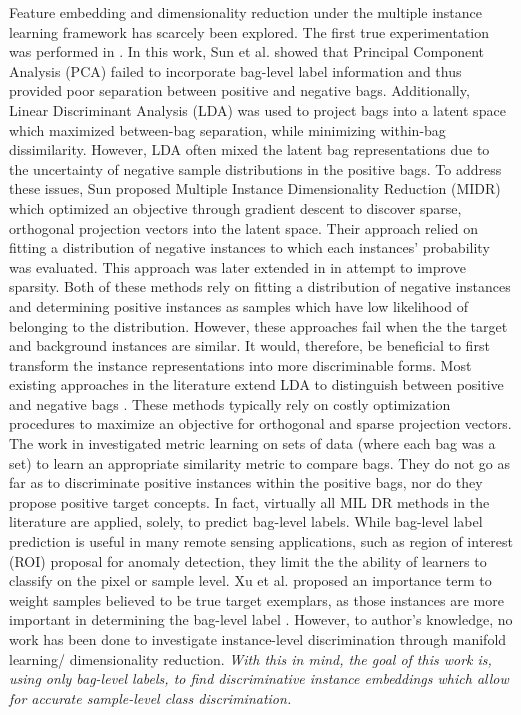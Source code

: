 Feature embedding and dimensionality reduction under the multiple instance learning framework has scarcely been explored.  The first true experimentation was performed in \cite{Sun2010MIDR}.  In this work, Sun et al. showed that Principal Component Analysis (PCA) failed to incorporate bag-level label information and thus provided poor separation between positive and negative bags.  Additionally, Linear Discriminant Analysis (LDA) was used to project bags into a latent space which maximized between-bag separation, while minimizing within-bag dissimilarity.  However, LDA often mixed the latent bag representations due to the uncertainty of negative sample distributions in the positive bags.  To address these issues, Sun proposed Multiple Instance Dimensionality Reduction (MIDR) which optimized an objective through gradient descent to discover sparse, orthogonal projection vectors into the latent space.  Their approach relied on fitting a distribution of negative instances to which each instances' probability was evaluated.  This approach was later extended in \cite{Zhu2018MIDRSparsity} in attempt to improve sparsity.  Both of these methods rely on fitting a distribution of negative instances and determining positive instances as samples which have low likelihood of belonging to the distribution.  However, these approaches fail when the the target and background instances are similar.  It would, therefore, be beneficial to first transform the instance representations into more discriminable forms.  Most existing approaches in the literature extend LDA to distinguish between positive and negative bags \cite{Chai2014MIDA,Zhu2018MIDRSparsity}.  These methods typically rely on costly optimization procedures to maximize an objective for orthogonal and sparse projection vectors.  The work in \cite{Xu2011MI_Metric_Learning} investigated metric learning on sets of data (where each bag was a set) to learn an appropriate similarity metric to compare bags.  They do not go as far as to discriminate positive instances within the positive bags, nor do they propose positive target concepts.  In fact, virtually all MIL DR methods in the literature are applied, solely, to predict bag-level labels. While bag-level label prediction is useful in many remote sensing applications, such as region of interest (ROI) proposal for anomaly detection, they limit the the ability of learners to classify on the pixel or sample level.  Xu et al. proposed an importance term to weight samples believed to be true target exemplars, as those instances are more important in determining the bag-level label \cite{Xu2011MI_Metric_Learning}.  However, to author's knowledge, no work has been done to investigate instance-level discrimination through manifold learning/ dimensionality reduction.  \textit{With this in mind, the goal of this work is, using only bag-level labels, to find discriminative instance embeddings which allow for accurate sample-level class discrimination.}

